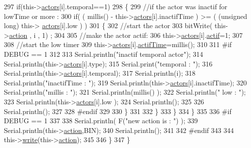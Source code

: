 \begin{DoxyCode}
297                 \textcolor{keywordflow}{if}(this->\hyperlink{classJetpack_a7e16d2f97837f9712a2e6de1c50d99db}{actors}[i].temporal==1)
298                 \{
299                     \textcolor{comment}{//if the actor was inactif for lowTime or more :}
300                     \textcolor{keywordflow}{if}( ( millis() - this->\hyperlink{classJetpack_a7e16d2f97837f9712a2e6de1c50d99db}{actors}[i].inactifTime ) >= ( (\textcolor{keywordtype}{unsigned} \textcolor{keywordtype}{long}) this->
      \hyperlink{classJetpack_a7e16d2f97837f9712a2e6de1c50d99db}{actors}[i].low  ) )
301                     \{
302                         \textcolor{comment}{//start the actor}
303                         bitWrite( this->\hyperlink{classJetpack_aca3142925a7b0834b34ae91d26af7765}{action} , i , 1) ;
304 
305                         \textcolor{comment}{//make the actor actif:}
306                         this->\hyperlink{classJetpack_a7e16d2f97837f9712a2e6de1c50d99db}{actors}[i].\hyperlink{structJetpack_1_1state_aa177541689bbaea21a4650a083b0df77}{actif}=1;
307 
308                         \textcolor{comment}{//start the low timer}
309                         this->\hyperlink{classJetpack_a7e16d2f97837f9712a2e6de1c50d99db}{actors}[i].\hyperlink{structJetpack_1_1state_af2e1cc323ef9ffcc3cf4d203f85d726b}{actifTime}=millis();
310 
311 \textcolor{preprocessor}{                    #if DEBUG == 1 }
312                         
313                         Serial.println(\textcolor{stringliteral}{"inactif temporal actor"});
314                         Serial.println(this->\hyperlink{classJetpack_a7e16d2f97837f9712a2e6de1c50d99db}{actors}[i].type);
315                         Serial.print(\textcolor{stringliteral}{"temporal : "});
316                         Serial.println(this->\hyperlink{classJetpack_a7e16d2f97837f9712a2e6de1c50d99db}{actors}[i].temporal);
317                         Serial.println(i);
318                         Serial.println(\textcolor{stringliteral}{"inactifTime : "});
319                         Serial.println(this->\hyperlink{classJetpack_a7e16d2f97837f9712a2e6de1c50d99db}{actors}[i].inactifTime);
320                         Serial.println(\textcolor{stringliteral}{"millis : "});
321                         Serial.println(millis() );
322                         Serial.println(\textcolor{stringliteral}{" low : "});
323                         Serial.println(this->\hyperlink{classJetpack_a7e16d2f97837f9712a2e6de1c50d99db}{actors}[i].low );
324                         Serial.println();
325 
326                         Serial.println();
327                     
328 \textcolor{preprocessor}{                    #endif}
329                 
330                     \}           
331             
332                 \}
333             \}
334         \}
335     
336 \textcolor{preprocessor}{    #if DEBUG == 1 }
337 
338         Serial.println( F(\textcolor{stringliteral}{"new action is : "}) );
339         Serial.println(this->\hyperlink{classJetpack_aca3142925a7b0834b34ae91d26af7765}{action},BIN);
340         Serial.println();
341     
342 \textcolor{preprocessor}{    #endif }
343 
344         this->\hyperlink{classJetpack_a338f1af8cbc6504ac69b47c7328569b5}{write}(this->\hyperlink{classJetpack_aca3142925a7b0834b34ae91d26af7765}{action});
345 
346     \} 
347 \}
\end{DoxyCode}
